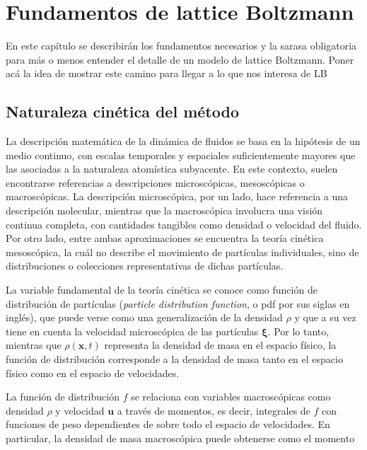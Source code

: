 \chapter{Fundamentos de lattice Boltzmann}

En este cap\'itulo se describir\'an los fundamentos necesarios y la sarasa obligatoria para m\'as o menos entender el detalle de un modelo de lattice Boltzmann.
Poner ac\'a la idea de mostrar este camino para llegar a lo que nos interesa de LB	

\section{Naturaleza cin\'etica del m\'etodo}
\label{sec:kinetic}
La descripci\'on matem\'atica de la din\'amica de fluidos se basa en la hip\'otesis de un medio continuo, con escalas temporales y espaciales suficientemente mayores que las asociadas a la naturaleza atom\'istica subyacente. En este contexto, suelen encontrarse referencias a descripciones microsc\'opicas, mesosc\'opicas o macrosc\'opicas. La descripci\'on microsc\'opica, por un lado, hace referencia a una descripci\'on molecular, mientras que la macrosc\'opica involucra una visi\'on continua completa, con cantidades tangibles como densidad o velocidad del fluido. Por otro lado, entre ambas aproximaciones se encuentra la teor\'ia cin\'etica mesosc\'opica, la cu\'al no describe el movimiento de part\'iculas individuales, sino de distribuciones o colecciones representativas de dichas part\'iculas.
\par
La variable fundamental de la teor\'ia cin\'etica se conoce como funci\'on de distribuci\'on de part\'iculas (\emph{particle distribution function}, o pdf por sus siglas en ingl\'es), que puede verse como una generalizaci\'on de la densidad $\rho$ y que a su vez tiene en cuenta la velocidad microsc\'opica de las part\'iculas $\bm{\xi}$. Por lo tanto, mientras que $\rho(\bm{x},t)$ representa la densidad de masa en el espacio f\'isico, la funci\'on de distribuci\'on \fvar{} corresponde a la densidad de masa tanto en el espacio f\'isico como en el espacio de velocidades.
\par
La funci\'on de distribuci\'on $f$ se relaciona con variables macrosc\'opicas como densidad $\rho$ y velocidad $\bm{u}$ a trav\'es de momentos, es decir, integrales de $f$ con funciones de peso dependientes de \bxi{} sobre todo el espacio de velocidades. En particular, la densidad de masa macrosc\'opica puede obtenerse como el momento

